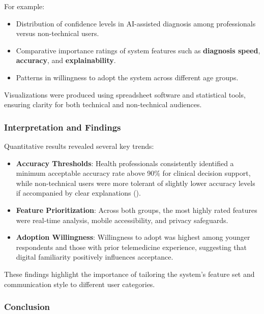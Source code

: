 \documentclass[
  12pt,
  oneside]{article}
\providecommand{\tightlist}{%
  \setlength{\itemsep}{0pt}\setlength{\parskip}{0pt}}
\begin{document}
For example:

\begin{itemize}
\tightlist
\item
  Distribution of confidence levels in AI-assisted diagnosis among
  professionals versus non-technical users.
\item
  Comparative importance ratings of system features such as
  \textbf{diagnosis speed}, \textbf{accuracy}, and
  \textbf{explainability}.
\item
  Patterns in willingness to adopt the system across different age
  groups.
\end{itemize}

Visualizations were produced using spreadsheet software and statistical
tools, ensuring clarity for both technical and non-technical audiences.

\subsubsection{Interpretation and
Findings}\label{interpretation-and-findings}

Quantitative results revealed several key trends:

\begin{itemize}
\tightlist
\item
  \textbf{Accuracy Thresholds}: Health professionals consistently
  identified a minimum acceptable accuracy rate above 90\% for clinical
  decision support, while non-technical users were more tolerant of
  slightly lower accuracy levels if accompanied by clear explanations
  ().
\item
  \textbf{Feature Prioritization}: Across both groups, the most highly
  rated features were real-time analysis, mobile accessibility, and
  privacy safeguards.
\item
  \textbf{Adoption Willingness}: Willingness to adopt was highest among
  younger respondents and those with prior telemedicine experience,
  suggesting that digital familiarity positively influences acceptance.
\end{itemize}

These findings highlight the importance of tailoring the system's
feature set and communication style to different user categories.

\subsubsection{Conclusion}\label{conclusion}
\end{document}
